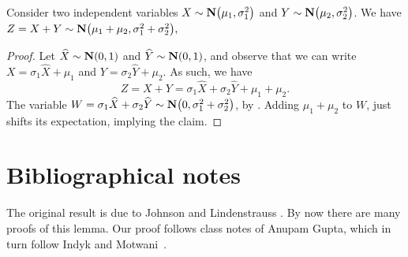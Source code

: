 \begin{lemma}
    Consider two independent variables
    $X \sim \NormalY{\mu_1}{\sigma_1^2}$ and
    $Y \sim \NormalY{\mu_2}{\sigma_2^2}$. We 
    have
    \begin{math}
        Z = X+ Y \sim \NormalY{ \mu_1 + \mu_2 }{ \sigma_1^2 +
           \sigma_2^2},
    \end{math}
\end{lemma}
\begin{proof}
    Let
    $\widehat{X} \sim \NormalY{0}{1}$
    and $\widehat{Y} \sim \NormalY{0}{1}$, and observe that we can
    write $X = \sigma_1 \widehat{X} + \mu_1$ and
    $Y = \sigma_2 \widehat{Y} + \mu_2$. As such, we have
    \begin{equation*}
        Z%
        =%
        X+Y%
        =%
        \sigma_1 \widehat{X}  + \sigma_2 \widehat{Y} + \mu_1 + \mu_2.
    \end{equation*}
    The variable
    $W = \sigma_1 \widehat{X} + \sigma_2 \widehat{Y} \sim
    \NormalY{0}{\sigma_1^2 + \sigma_2^2}$, by
    . Adding $\mu_1 + \mu_2$ to $W$, just
    shifts its expectation, implying the claim.
\end{proof}






\section{Bibliographical notes} 

The original result is due to Johnson and Lindenstrauss
\cite{jl-elmih-84}. By now there are many proofs of this lemma. Our
proof follows class notes of Anupam Gupta, which in turn follow Indyk
and Motwani~\cite{im-anntr-98}.




\ChapterEnd{}

%
